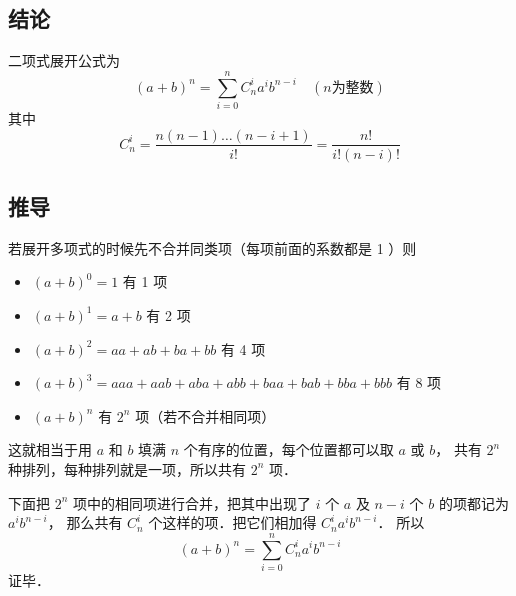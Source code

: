 

\subsection{结论}
二项式展开公式为
\begin{equation}
(a + b)^n = \sum_{i = 0}^n  C_n^i a^i b^{n - i} \quad (n \text{为整数})
\end{equation}
其中
\begin{equation}
C_n^i = \frac{n(n - 1)\dots (n - i + 1)}{i!} = \frac{n!}{i!(n - i)!}
\end{equation}

\subsection{推导}
若展开多项式的时候先不合并同类项（每项前面的系数都是 1 ）则
\begin{itemize}
\item $(a + b)^0 = 1$ 有 1 项
\item $(a + b)^1 = a + b$ 有 2 项
\item $(a + b)^2 = aa + ab + ba + bb$ 有 4 项
\item $(a + b)^3 = aaa + aab + aba + abb + baa + bab + bba + bbb$ 有 8 项
\item $(a + b)^n$ 有 $2^n$ 项（若不合并相同项）
\end{itemize}

这就相当于用 $a$ 和 $b$ 填满 $n$ 个有序的位置，每个位置都可以取 $a$ 或 $b$， 共有 $2^n$ 种排列，每种排列就是一项，所以共有 $2^n$ 项．

下面把 $2^n$ 项中的相同项进行合并，把其中出现了 $i$ 个 $a$ 及 $n-i$ 个 $b$ 的项都记为 $a^i b^{n-i}$， 那么共有 $C_n^i$ 个这样的项．把它们相加得 $C_n^i a^i b^{n-i}$． 所以
\begin{equation}
(a + b)^n = \sum_{i = 0}^n  C_n^i a^i b^{n - i}
\end{equation}
证毕．
